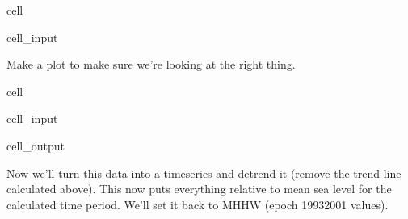 \documentclass[letterpaper,10pt,english]{jupyterBook}
\begin{document}
\begin{sphinxuseclass}{cell}
\begin{sphinxVerbatimInput}
\begin{sphinxuseclass}{cell_input}
\begin{sphinxVerbatim}[commandchars=\\\{\}]
    \PYG{p}{[}\PYG{p}{]}
\end{sphinxVerbatim}

\end{sphinxuseclass}\end{sphinxVerbatimInput}

\end{sphinxuseclass}
\sphinxAtStartPar
Make a plot to make sure we’re looking at the right thing.

\begin{sphinxuseclass}{cell}\begin{sphinxVerbatimInput}

\begin{sphinxuseclass}{cell_input}
\begin{sphinxVerbatim}[commandchars=\\\{\}]
\PYG{p}{[}\PYG{p}{]}
\end{sphinxVerbatim}

\end{sphinxuseclass}\end{sphinxVerbatimInput}
\begin{sphinxVerbatimOutput}

\begin{sphinxuseclass}{cell_output}
\begin{sphinxVerbatim}
\end{sphinxVerbatim}

\noindent{}

\end{sphinxuseclass}\end{sphinxVerbatimOutput}

\end{sphinxuseclass}
\sphinxAtStartPar
Now we’ll turn this data into a timeseries and detrend it (remove the trend line calculated above). This now puts everything relative to mean sea level for the calculated time period. We’ll set it back to MHHW (epoch 1993\sphinxhyphen{}2001 values).
\end{document}
